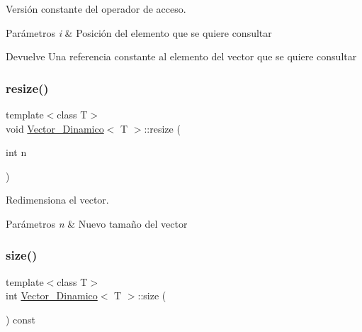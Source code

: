 Versión constante del operador de acceso. 


\begin{DoxyParams}{Parámetros}
{\em i} & Posición del elemento que se quiere consultar \\
\hline
\end{DoxyParams}
\begin{DoxyReturn}{Devuelve}
Una referencia constante al elemento del vector que se quiere consultar 
\end{DoxyReturn}
\mbox{\label{classVector__Dinamico_a1b7bf3f5b5dd748bbb55b8e2cd448c94}} 
\subsubsection{\texorpdfstring{resize()}{resize()}}
{\footnotesize\ttfamily template$<$class T$>$ \\
void \mbox{\hyperlink{classVector__Dinamico}{Vector\+\_\+\+Dinamico}}$<$ T $>$\+::resize (\begin{DoxyParamCaption}\item[{int}]{n }\end{DoxyParamCaption})}



Redimensiona el vector. 


\begin{DoxyParams}{Parámetros}
{\em n} & Nuevo tamaño del vector \\
\hline
\end{DoxyParams}
\mbox{\label{classVector__Dinamico_af4050e799003ac92ab8da36d8bd5bb00}} 
\subsubsection{\texorpdfstring{size()}{size()}}
{\footnotesize\ttfamily template$<$class T$>$ \\
int \mbox{\hyperlink{classVector__Dinamico}{Vector\+\_\+\+Dinamico}}$<$ T $>$\+::size (\begin{DoxyParamCaption}{ }\end{DoxyParamCaption}) const}



